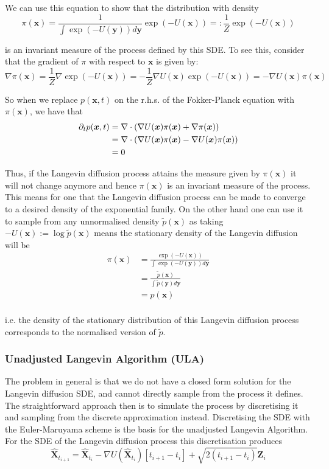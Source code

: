 We can use this equation to show that the distribution with density
\[
	\pi(\bm{x}) = \frac{ 1 }{ \int \exp(-U(\bm{y})) d\bm{y} }  \exp(-U(\bm{x})) =: \frac{ 1 }{ Z } \exp(-U(\bm{x}))
\]

is an invariant measure of the process defined by this SDE. 
To see this, consider that the gradient of $\pi$ with respect to $\bm{x}$ is given by:
\[
	\nabla \pi(\bm{x}) 
	= \frac{ 1 }{ Z } \nabla \exp( -U(\bm{x}) )
	= - \frac{ 1 }{ Z } \nabla U(\bm{x}) \exp( -U(\bm{x}) )
	= - \nabla U(\bm{x}) \pi(\bm{x})
\]

So when we replace $p(\bm{x}, t)$ on the r.h.s. of the Fokker-Planck equation with $\pi(\bm{x})$, we have that
\[
\begin{aligned}
	\partial_t p(\bm{x},t) 
	&= \nabla \cdot \left( \nabla U(\bm{x}) \pi(\bm{x}) + \nabla \pi(\bm{x}) \right) \\
	&= \nabla \cdot \left( \nabla U(\bm{x}) \pi(\bm{x}) - \nabla U(\bm{x}) \pi(\bm{x}) \right) \\
	&= 0 \\
\end{aligned}
\]

Thus, if the Langevin diffusion process attains the measure given by $\pi(\bm{x})$ it will not change anymore and hence $\pi(\bm{x})$ is an invariant measure of the process.
This means for one that the Langevin diffusion process can be made to converge to a desired density of the exponential family.
On the other hand one can use it to sample from any unnormalised density $\tilde{p}(\bm{x})$ as taking $-U(\bm{x}) := \log \tilde{p}(\bm{x})$
means the stationary density of the Langevin diffusion will be
\[
\begin{aligned}
	\pi(\bm{x}) 
	&= \frac{ \exp(-U(\bm{x})) }{ \int \exp(-U(\bm{y})) d\bm{y} } \\
	&= \frac{ \tilde{p}(\bm{x}) }{ \int \tilde{p}(\bm{y}) d\bm{y} } \\
	&= p(\bm{x}) \\
\end{aligned}
\]

i.e. the density of the stationary distribution of this Langevin diffusion process corresponds to the normalised version of $\tilde{p}$.


\subsubsection{Unadjusted Langevin Algorithm (ULA)}

The problem in general is that we do not have a closed form solution for the Langevin diffusion SDE, and cannot directly sample from the process it defines.
The straightforward approach then is to simulate the process by discretising it and sampling from the discrete approximation instead.
Discretising the SDE with the Euler-Maruyama scheme is the basis for the unadjusted Langevin Algorithm. 
For the SDE of the Langevin diffusion process this discretisation produces
\[
	\hat{\bm{X}}_{t_{i+1}} = \hat{\bm{X}}_{t_i} - \nabla U( \hat{\bm{X}}_{t_i} ) [t_{i+1} - t_i] + \sqrt{2 (t_{i+1} - t_i)} \bm{Z}_i
\]

